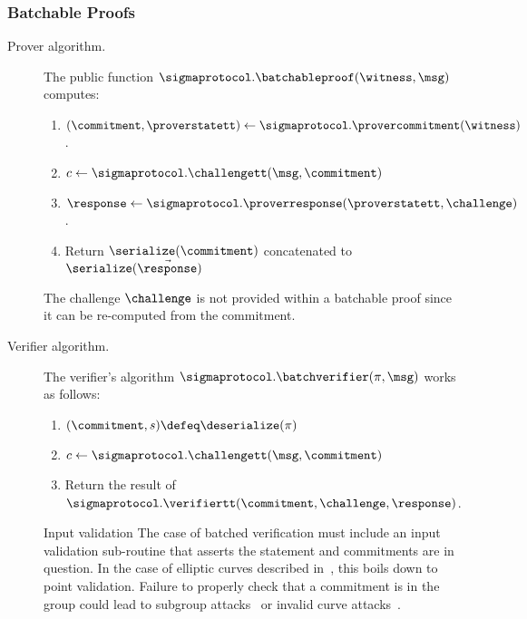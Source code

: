 \documentclass[11pt]{article}
\begin{document}
\subsubsection{Batchable Proofs}

\begin{description}
\item[Prover algorithm.]
The public function $\sigmaprotocol.\batchableproof( \witness, \msg)$ computes:
\begin{enumerate}
\item
   $(\commitment,\proverstatett)\gets\sigmaprotocol.\provercommitment( \witness)$.
\item
$c \gets \sigmaprotocol.\challengett(\msg,\commitment)$
\item
   $\response\gets\sigmaprotocol.\proverresponse(\proverstatett,  \challenge)$.
\item Return $\serialize(\commitment)$ concatenated to $\serialize(\vec \response)$
\end{enumerate}
The challenge $\challenge$ is not provided within a batchable proof since it can be re-computed from the commitment.
\item[Verifier algorithm.] The verifier's algorithm $\sigmaprotocol.\batchverifier(\pi, \msg)$ works as follows:
\begin{enumerate}
  \item $(\commitment,s) \defeq \deserialize(\pi)$
  \item
    $c \gets \sigmaprotocol.\challengett(\msg, \commitment)$
  \item
    Return the result of $\sigmaprotocol.\verifiertt(\commitment,\challenge, \response)$.
\end{enumerate}
\begin{warning}{Input validation}{}
The case of batched verification must include an input validation sub-routine that asserts the statement and commitments are in question.
In the case of elliptic curves described in~, this boils down to point validation.
Failure to properly check that a commitment is in the group could lead to subgroup attacks~\cite{EC:VanWie96,C:LimLee97} or invalid curve attacks~\cite{C:BieMeyMul00,RSA:BBPV12}.
\end{warning}

\end{description}
\end{document}
